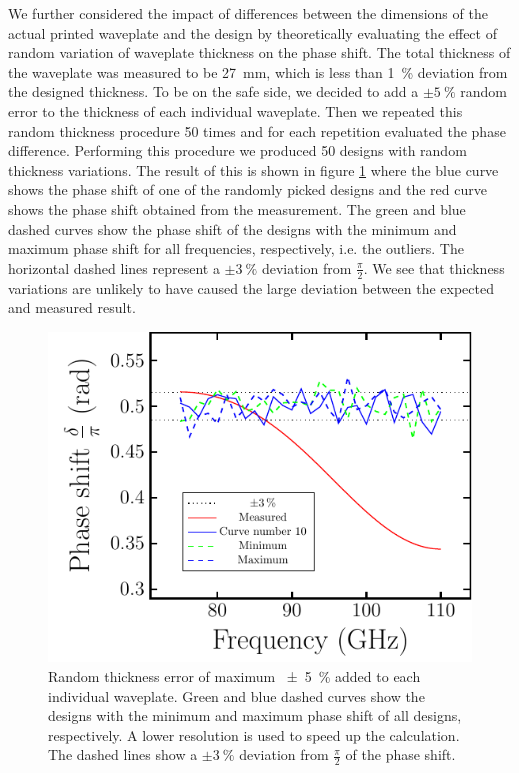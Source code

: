We further considered the impact of differences between the dimensions of the actual printed waveplate and the design by theoretically evaluating the effect of random variation of waveplate thickness on the phase shift. The total thickness of the waveplate was measured to be \SI{27}{\milli \meter}, which is less than \SI{1}{\percent} deviation from the designed thickness. To be on the safe side, we decided to add a $\pm \SI{5}{\percent}$ random error to the thickness of each individual waveplate. Then we repeated this random thickness procedure 50 times and for each repetition evaluated the phase difference. Performing this procedure we produced 50 designs with random thickness variations. The result of this is shown in figure \ref{fig:delta_width_err} where the blue curve shows the phase shift of one of the randomly picked designs and the red curve shows the phase shift obtained from the measurement. The green and blue dashed curves show the phase shift of the designs with the minimum and maximum phase shift for all frequencies, respectively, i.e. the outliers. The horizontal dashed lines represent a $\pm \SI{3}{\percent}$ deviation from $\frac{\pi}{2}$. We see that thickness variations are unlikely to have caused the large deviation between the expected and measured result.

\begin{figure}[H]
    \centering
    \includegraphics[scale=0.63]{images/results/plots/polymer/dimension_errors/delta_width_error_a.pdf}
    \caption{Random thickness error of maximum \SI{\pm 5}{\percent} added to each individual waveplate. Green and blue dashed curves show the designs with the minimum and maximum phase shift of all designs, respectively. A lower resolution is used to speed up the calculation. The dashed lines show a $\pm \SI{3}{\percent}$ deviation from $\frac{\pi}{2}$ of the phase shift.}
    \label{fig:delta_width_err}
\end{figure}

